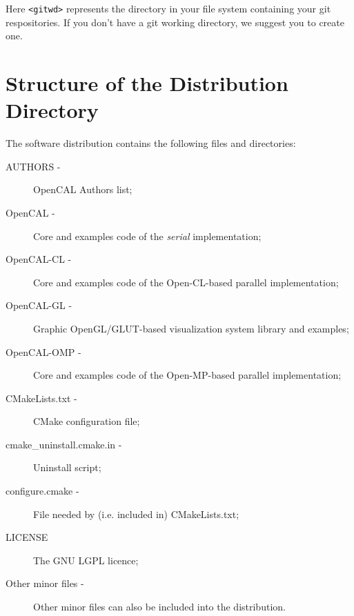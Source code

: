 \noindent Here \verb'<gitwd>' represents the directory in your file
system containing your git respositories. If you don't have a git
working directory, we suggest you to create one.


\section{Structure of the Distribution Directory}

The software distribution contains the following files and
directories:

\begin{description}
\item[AUTHORS - ] OpenCAL Authors list;
\item[OpenCAL - ] Core and examples code of the \emph{serial}
  implementation;
\item[OpenCAL-CL - ] Core and examples code of the Open-CL-based
  parallel implementation;
\item[OpenCAL-GL - ] Graphic OpenGL/GLUT-based visualization system
  library and examples;
\item[OpenCAL-OMP - ] Core and examples code of the Open-MP-based
  parallel implementation;
\item[CMakeLists.txt - ] CMake configuration file;
\item[cmake\_uninstall.cmake.in - ] Uninstall script;
\item[configure.cmake - ] File needed by (i.e. included in) CMakeLists.txt;
\item[LICENSE] The GNU LGPL licence;
\item[Other minor files - ] Other minor files can also be included into the distribution.
\end{description}



